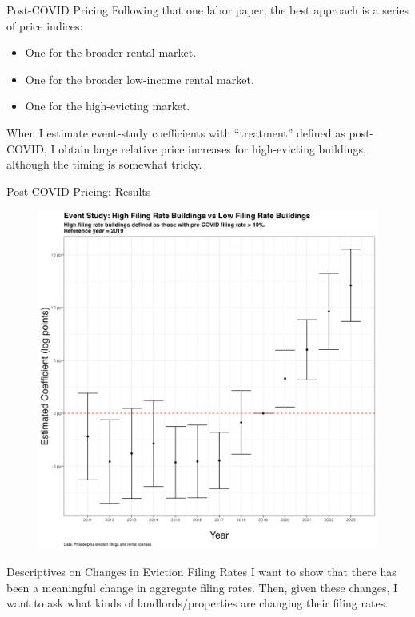 \documentclass[aspectratio=169]{beamer}
\begin{document}
\begin{frame}{Post-COVID Pricing}
Following that one labor paper, the best approach is a series of price indices:
\begin{itemize}
  \item One for the broader rental market.
  \item One for the broader low-income rental market.
  \item One for the high-evicting market.
\end{itemize}

When I estimate event-study coefficients with “treatment” defined as post-COVID, I obtain large relative price increases for high-evicting buildings, although the timing is somewhat tricky.
\end{frame}


\begin{frame}{Post-COVID Pricing: Results}
\tiny
\begin{figure}
  \includegraphics[scale=0.25]{figs/event_study_high_filing_2019.png}
\end{figure}
\end{frame}


\begin{frame}{Descriptives on Changes in Eviction Filing Rates}
I want to show that there has been a meaningful change in aggregate filing rates. Then, given these changes, I want to ask what kinds of landlords/properties are changing their filing rates.
\end{frame}
\end{document}
